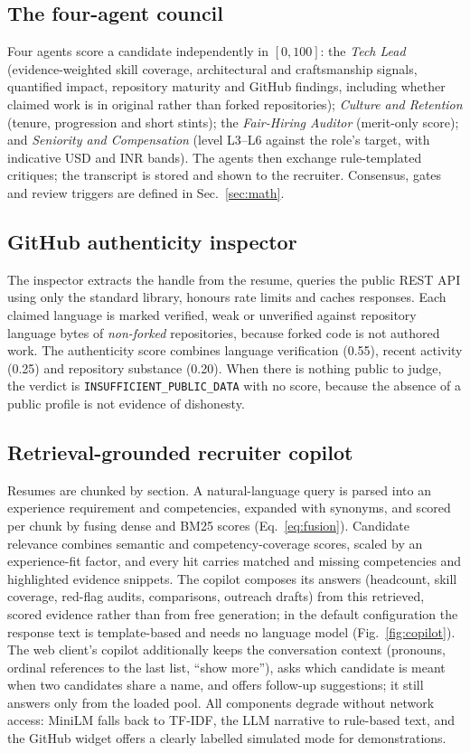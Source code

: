\documentclass[conference]{IEEEtran}
\newcommand{\flag}[1]{\texttt{\footnotesize #1}}
\begin{document}
\subsection{The four-agent council}
Four agents score a candidate independently in $[0,100]$: the \emph{Tech Lead} (evidence-weighted skill coverage, architectural and craftsmanship signals, quantified impact, repository maturity and GitHub findings, including whether claimed work is in original rather than forked repositories); \emph{Culture and Retention} (tenure, progression and short stints); the \emph{Fair-Hiring Auditor} (merit-only score); and \emph{Seniority and Compensation} (level L3--L6 against the role's target, with indicative USD and INR bands). The agents then exchange rule-templated critiques; the transcript is stored and shown to the recruiter. Consensus, gates and review triggers are defined in Sec.~\ref{sec:math}.

\subsection{GitHub authenticity inspector}
The inspector extracts the handle from the resume, queries the public REST API using only the standard library, honours rate limits and caches responses. Each claimed language is marked verified, weak or unverified against repository language bytes of \emph{non-forked} repositories, because forked code is not authored work. The authenticity score combines language verification (0.55), recent activity (0.25) and repository substance (0.20). When there is nothing public to judge, the verdict is \flag{INSUFFICIENT\_PUBLIC\_DATA} with no score, because the absence of a public profile is not evidence of dishonesty.

\subsection{Retrieval-grounded recruiter copilot}
Resumes are chunked by section. A natural-language query is parsed into an experience requirement and competencies, expanded with synonyms, and scored per chunk by fusing dense and BM25 scores (Eq.~\ref{eq:fusion}). Candidate relevance combines semantic and competency-coverage scores, scaled by an experience-fit factor, and every hit carries matched and missing competencies and highlighted evidence snippets. The copilot composes its answers (headcount, skill coverage, red-flag audits, comparisons, outreach drafts) from this retrieved, scored evidence rather than from free generation; in the default configuration the response text is template-based and needs no language model (Fig.~\ref{fig:copilot}). The web client's copilot additionally keeps the conversation context (pronouns, ordinal references to the last list, ``show more''), asks which candidate is meant when two candidates share a name, and offers follow-up suggestions; it still answers only from the loaded pool. All components degrade without network access: MiniLM falls back to TF-IDF, the LLM narrative to rule-based text, and the GitHub widget offers a clearly labelled simulated mode for demonstrations.
\end{document}
